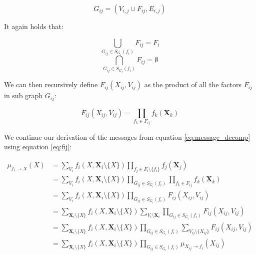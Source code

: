 \begin{equation}
G_{ij} = (V_{i,j} \cup F_{ij}, E_{i,j})
\end{equation}

\noindent
It again holds that:

\begin{multicols}{2}
\begin{equation}
\bigcup_{G_{ij} \in S_{G_i}(f_i)} F_{ij} = F_i 
\end{equation}\break
\begin{equation}
\bigcap_{G_{ij} \in S_{G_i}(f_i)} F_{ij} = \emptyset
\end{equation}
\end{multicols}

\noindent
We can then recursively define $F_{ij}(X_{ij}, V_{ij})$
as the product of all the factors $F_{ij}$ in sub graph $G_{ij}$:

\begin{equation}\label{eq:fij}
F_{ij}(X_{ij}, V_{ij}) = \prod_{f_{k} \in F_{ij}}f_{k}(\textbf{X}_{k})
\end{equation}

\noindent
We continue our derivation of the messages from equation 
\ref{eq:message_decomp} using equation \ref{eq:fij}:

\begin{equation}\label{eq:message_var_to_fact_der}\begin{split}
\mu_{f_i \rightarrow X} (X)
	&= \sum_{V_i}f_i(X, \textbf{X}_i \setminus \{X\}) 
		\prod_{f_j \in F_i \setminus \{f_i\}} f_j(\textbf{X}_j)\\
	&= \sum_{V_i}f_i(X, \textbf{X}_i \setminus \{X\}) 
		\prod_{G_{ij} \in S_{G_i}(f_i)} \prod_{f_{k} \in F_{ij} }
			f_{k}(\textbf{X}_k)\\
	&= \sum_{V_i}f_i(X, \textbf{X}_i \setminus \{X\}) 
		\prod_{G_{ij} \in S_{G_i}(f_i)} F_{ij}(X_{ij}, V_{ij})\\
	&= \sum_{\textbf{X}_i\setminus \{X\}} f_i(X, \textbf{X}_i \setminus \{X\}) 
		\sum_{V_i \setminus \textbf{X}_i}\prod_{G_{ij} \in S_{G_i}(f_i)} 
			F_{ij}(X_{ij}, V_{ij})\\
	&= \sum_{\textbf{X}_i\setminus \{X\}} f_i(X, \textbf{X}_i \setminus \{X\}) 
		\prod_{G_{ij} \in S_{G_i}(f_i)} \sum_{V_{ij} \setminus \{X_{ij}\}}
			F_{ij}(X_{ij}, V_{ij})\\
	&= \sum_{\textbf{X}_i\setminus \{X\}} f_i(X, \textbf{X}_i \setminus \{X\}) 
		\prod_{G_{ij} \in S_{G_i}(f_i)} \mu_{X_{ij} \rightarrow f_i}(X_{ij})
\end{split}\end{equation}

